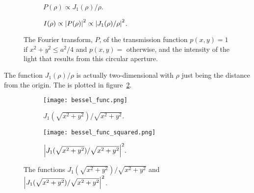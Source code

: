 \documentclass[a4paper]{article}
\begin{document}
    \begin{figure}[ht]
        \centering
        \begin{subfigure}{0.9\textwidth}
            \centering
            
            \caption{\(P(\rho) \propto J_1(\rho)/\rho\).}
        \end{subfigure}
        \begin{subfigure}{0.9\textwidth}
            \centering
            
            \caption{\(I(\rho) \propto \abs{P(\rho)}^2 \propto \abs{J_1(\rho)/\rho}^2\).}
        \end{subfigure}
        \caption{The Fourier transform, \(P\), of the transmission function \(p(x, y) = 1\) if \(x^2 + y^2 \le a^2/4\) and \(p(x, y) = \) otherwise, and the intensity of the light that results from this circular aperture.}
        \label{fig:bessel funcs}
    \end{figure}
    The function \(J_1(\rho)/\rho\) is actually two-dimensional with \(\rho\) just being the distance from the origin.
    The is plotted in figure~\ref{fig:bessel funcs 3d}.
    \begin{figure}[htbp!]
        \centering
        \begin{subfigure}{0.45\textwidth}
            \centering
            \texttt{[image: bessel\_func.png]}
            \caption{\(J_1(\sqrt{x^2 + y^2})/\sqrt{x^2 + y^2}.\)}
        \end{subfigure}
        \begin{subfigure}{0.45\textwidth}
            \centering
            \texttt{[image: bessel\_func\_squared.png]}
            \caption{\(\abs{J_1(\sqrt{x^2 + y^2})/\sqrt{x^2 + y^2}}^2.\)}
        \end{subfigure}
        \caption{The functions \(J_1(\sqrt{x^2 + y^2})/\sqrt{x^2 + y^2}\) and \(\abs{J_1(\sqrt{x^2 + y^2})/\sqrt{x^2 + y^2}}^2\).}
        \label{fig:bessel funcs 3d}
    \end{figure}
    
\end{document}
